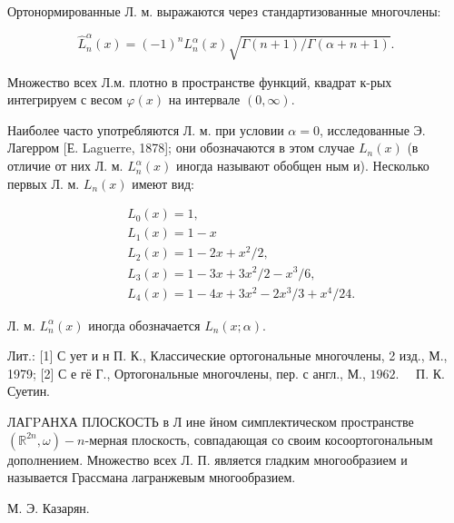 \documentclass[10pt]{article}
\begin{document}
Ортонормированные Л. м. выражаются через стандартизованные многочлены:



\[

\hat{L}_{n}^{\alpha}(x)=(-1)^{n} L_{n}^{\alpha}(x) \sqrt{\Gamma(n+1) / \Gamma(\alpha+n+1)} .

\]



Множество всех Л.м. плотно в пространстве функций, квадрат к-рых интегрируем с весом $\varphi(x)$ на интервале $(0, \infty)$.



Наиболее часто употребляются Л. м. при условии $\alpha=0$, исследованные Э. Лагерром [Е. Laguerre, 1878]; они обозначаются в этом случае $L_{n}(x)$ (в отличие от них Л. м. $L_{n}^{\alpha}(x)$ иногда называют обобщен ным и). Несколько первых Л. м. $L_{n}(x)$ имеют вид:



\[

\begin{aligned}

& L_{0}(x)=1, \\

& L_{1}(x)=1-x \\

& L_{2}(x)=1-2 x+x^{2} / 2, \\

& L_{3}(x)=1-3 x+3 x^{2} / 2-x^{3} / 6, \\

& L_{4}(x)=1-4 x+3 x^{2}-2 x^{3} / 3+x^{4} / 24 .

\end{aligned}

\]



Л. м. $L_{n}^{\alpha}(x)$ иногда обозначается $L_{n}(x ; \alpha)$.



Лит.: [1] С ует и н П. К., Классические ортогональные многочлены, 2 изд., М., 1979; [2] С е гё Г., Ортогональные многочлены, пер. с англ., М., $1962 . \quad$ П. К. Суетин.



ЛАГPАНХА ПЛОСКОСТЬ в Л ине йном симплектическом пространстве $\left(\mathbb{R}^{2 n}, \omega\right)-n$-мерная плоскость, совпадающая со своим косоортогональным дополнением. Множество всех Л. П. является гладким многообразием и называется Грассмана лагранжевым многообразием.



М. Э. Казарян.
\end{document}
